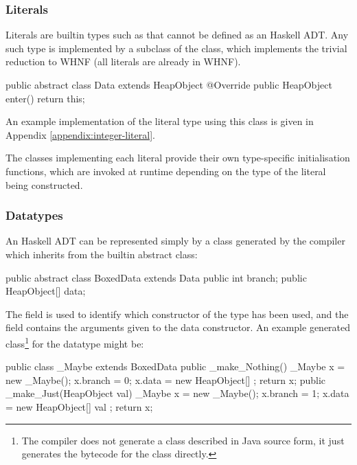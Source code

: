 \documentclass[dissertation.tex]{subfiles}
\begin{document}
{{        \subsubsection{Literals}\label{sec:literals}
        {
            Literals are builtin types such as  that cannot be defined as an Haskell ADT. Any such type is implemented by a subclass of the  class, which implements the trivial reduction to WHNF (all literals are already in WHNF).

            \begin{javafigure}
            public abstract class Data extends HeapObject {
                @Override
                public HeapObject enter() {
                    return this;
                }
            }
            \end{javafigure}

            An example implementation of the  literal type using this class is given in Appendix \ref{appendix:integer-literal}.

            The classes implementing each literal provide their own type-specific initialisation functions, which are invoked at runtime depending on the type of the literal being constructed.
        }
        \subsubsection{Datatypes}
        {
            An Haskell ADT can be represented simply by a class generated by the compiler which inherits from the  builtin abstract class:

            \begin{javafigure}
            public abstract class BoxedData extends Data {
                public int branch;
                public HeapObject[] data;
            }
            \end{javafigure}

            The  field is used to identify which constructor of the type has been used, and the  field contains the arguments given to the data constructor. An example generated class\footnote{The compiler does not generate a class described in Java source form, it just generates the bytecode for the class directly.} for the datatype  might be:

            \begin{javafigure}
            public class _Maybe extends BoxedData {
                public _make_Nothing() {
                    _Maybe x = new _Maybe();
                    x.branch = 0;
                    x.data = new HeapObject[] {};
                    return x;
                }
                public _make_Just(HeapObject val) {
                    _Maybe x = new _Maybe();
                    x.branch = 1;
                    x.data = new HeapObject[] { val };
                    return x;
                }
            }
            \end{javafigure}

}}}
\end{document}
